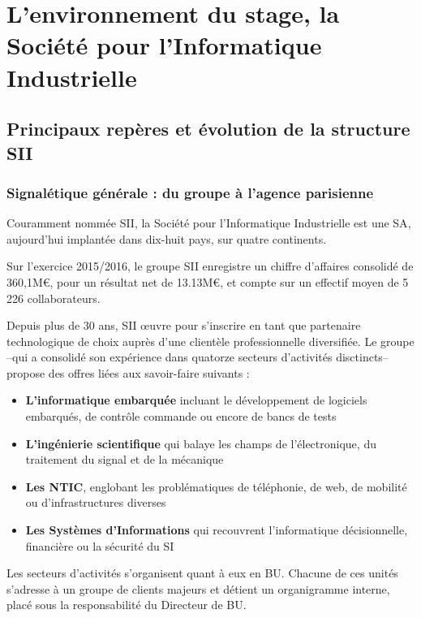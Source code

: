 \chapter{L'environnement du stage, la Société pour l'Informatique Industrielle}

\section{Principaux repères et évolution de la structure SII}

\subsection{Signalétique générale : du groupe à l'agence parisienne}

Couramment nommée \gls{SII}, la Société pour l'Informatique Industrielle est une \gls{SA}, aujourd'hui implantée dans dix-huit pays, sur quatre continents.

Sur l'exercice 2015/2016, le groupe SII enregistre un chiffre d'affaires consolidé de 360,1M\euro\cite{Bib_exercice_2015_2016}, pour un résultat net de 13.13M\euro\cite{Bib_exercice_2015_2016}, et compte sur un effectif moyen de 5 226 collaborateurs\cite{Bib_exercice_2015_2016}. 

Depuis plus de 30 ans\cite{Bib_exercice_2015_2016}\cite{Bib_memento_ag_idf}, SII \oe{}uvre pour s'inscrire en tant que partenaire technologique de choix auprès d'une clientèle professionnelle diversifiée. 
Le groupe --qui a consolidé son expérience dans quatorze secteurs d'activités disctincts-- propose des offres liées aux savoir-faire suivants : 

\begin{itemize}
 \item \textbf{L'informatique embarquée} incluant le développement de logiciels embarqués, de contrôle commande ou encore de bancs de tests   
 \item \textbf{L'ingénierie scientifique} qui balaye les champs de l'électronique, du traitement du signal et de la mécanique
 \item \textbf{Les \gls{NTIC}}, englobant les problématiques de téléphonie, de web, de mobilité ou d'infrastructures diverses
 \item \textbf{Les Systèmes d'Informations} qui recouvrent l'informatique décisionnelle, financière ou la sécurité du \gls{SI}
\end{itemize}

Les secteurs d'activités s'organisent quant à eux en \gls{BU}. Chacune de ces unités s'adresse à un groupe de clients majeurs et détient un organigramme interne, placé sous la responsabilité du Directeur de \gls{BU}. 

